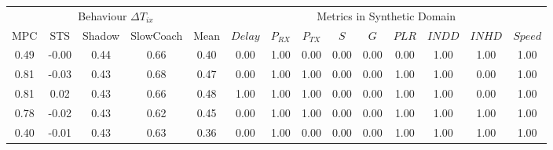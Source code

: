 \begin{tabular}{|*{5}{c|}|*{9}{c|}}
\toprule
\multicolumn{5}{|c||}{Behaviour $\Delta T_{ix}$} & \multicolumn{9}{c|}{Metrics in Synthetic Domain}\\
               MPC &   STS & Shadow & SlowCoach & Mean &                     $Delay$ & $P_{RX}$ & $P_{TX}$ &  $S$ &  $G$ & $PLR$ & $INDD$ & $INHD$ & $Speed$ \\
\midrule
              0.49 & -0.00 &   0.44 &      0.66 & 0.40 &                        0.00 &     1.00 &     0.00 & 0.00 & 0.00 &  0.00 &   1.00 &   1.00 &    1.00 \\
              0.81 & -0.03 &   0.43 &      0.68 & 0.47 &                        0.00 &     1.00 &     1.00 & 0.00 & 0.00 &  1.00 &   1.00 &   0.00 &    1.00 \\
              0.81 &  0.02 &   0.43 &      0.66 & 0.48 &                        1.00 &     1.00 &     1.00 & 0.00 & 0.00 &  1.00 &   1.00 &   0.00 &    1.00 \\
              0.78 & -0.02 &   0.43 &      0.62 & 0.45 &                        0.00 &     1.00 &     1.00 & 0.00 & 0.00 &  1.00 &   1.00 &   1.00 &    1.00 \\
              0.40 & -0.01 &   0.43 &      0.63 & 0.36 &                        0.00 &     1.00 &     0.00 & 0.00 & 0.00 &  1.00 &   1.00 &   1.00 &    1.00 \\
\bottomrule
\end{tabular}
